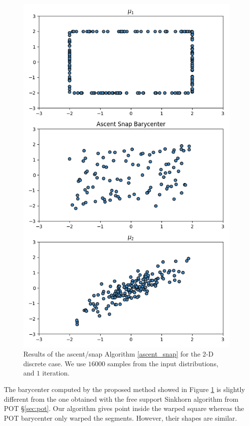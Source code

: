 \begin{figure}
    \centering
    \includegraphics[width=\textwidth]{figures/ascent_snap_2D_discrete_barycenter.png}
    \caption{Results of the ascent/snap Algorithm \ref{ascent_snap} for the 2-D discrete case. We use $16000$ samples from the input distributions, and $1$ iteration.}
    \label{fig:ascent_snap_2D_discrete}
\end{figure}

The barycenter computed by the proposed method showed in Figure \ref{fig:ascent_snap_2D_discrete} is slightly different from the one obtained with the free support Sinkhorn algorithm from POT \S\ref{sec:pot}. Our algorithm gives point inside the warped square whereas the POT barycenter only warped the segments. However, their shapes are similar. 

